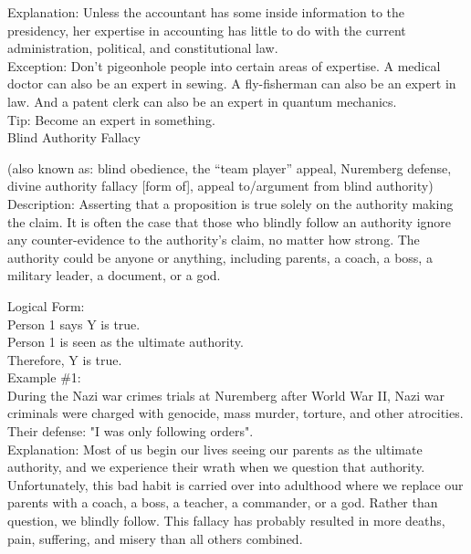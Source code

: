 \documentclass[a4paper,12pt,single,pdftex]{scrbook}
\begin{document}
    
      Explanation: Unless the accountant has some inside information to the presidency, her expertise in accounting has little to do with the current administration, political, and constitutional law.
    \\

    
      Exception: Don't pigeonhole people into certain areas of expertise. A medical doctor can also be an expert in sewing. A fly-fisherman can also be an expert in law. And a patent clerk can also be an expert in quantum mechanics.
    \\

    
      Tip: Become an expert in something.
    \\

  

Blind Authority Fallacy
    
      (also known as: blind obedience, the “team player” appeal, Nuremberg defense, divine authority fallacy [form of], appeal to/argument from blind authority)
    \\

  
    Description: Asserting that a proposition is true solely on the authority making the claim. It is often the case that those who blindly follow an authority ignore any counter-evidence to the authority’s claim, no matter how strong. The authority could be anyone or anything, including parents, a coach, a boss, a military leader, a document, or a god.

    
      Logical Form:
    \\

    
      Person 1 says Y is true.
    \\

    
      Person 1 is seen as the ultimate authority.
    \\

    
      Therefore, Y is true.
    \\

    
      Example \#1:
    \\

    
      During the Nazi war crimes trials at Nuremberg after World War II,  Nazi war criminals were charged with genocide, mass murder, torture, and other atrocities.  Their defense: "I was only following orders".
    \\

    
      Explanation: Most of us begin our lives seeing our parents as the ultimate authority, and we experience their wrath when we question that authority.  Unfortunately, this bad habit is carried over into adulthood where we replace our parents with a coach, a boss, a teacher, a commander, or a god.  Rather than question, we blindly follow.  This fallacy has probably resulted in more deaths, pain, suffering, and misery than all others combined.
    \\
\end{document}
